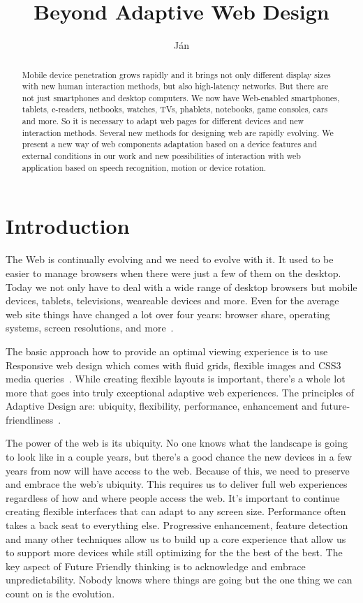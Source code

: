 \documentclass{iitsrc}
\title{Beyond Adaptive Web Design}
\author{Ján}{Antala}
\begin{document}
\begin{abstract}
Mobile device penetration grows rapidly and it brings not only different display sizes with new human interaction methods, but also high-latency networks. But there are not just smartphones and desktop computers. We now have Web-enabled smartphones, tablets, e-readers, netbooks, watches, TVs, phablets, notebooks, game consoles, cars and more. So it is necessary to adapt web pages for different devices and new interaction methods. Several new methods for designing web are rapidly evolving. We present a new way of web components adaptation based on a device features and external conditions in our work and new possibilities of interaction with web application based on speech recognition, motion or device rotation.
\end{abstract}

\section{Introduction}

The Web is continually evolving and we need to evolve with it. It used to be easier to manage browsers when there were just a few of them on the desktop. Today we not only have to deal with a wide range of desktop browsers but mobile devices, tablets, televisions, weareable devices and more. Even for the average web site things have changed a lot over four years: browser share, operating systems, screen resolutions, and more~\cite{ui17}.

The basic approach how to provide an optimal viewing experience is to use Responsive web design which comes with fluid grids, flexible images and CSS3 media queries~\cite{responsive}. While creating flexible layouts is important, there’s a whole lot more that goes into truly exceptional adaptive web experiences. The principles of Adaptive Design are: ubiquity, flexibility, performance, enhancement and future-friendliness~\cite{adaptivesxsw}.

The power of the web is its ubiquity. No one knows what the landscape is going to look like in a couple years, but there’s a good chance the new devices in a few years from now will have access to the web. Because of this, we need to preserve and embrace the web’s ubiquity. This requires us to deliver full web experiences regardless of how and where people access the web. It's important to continue creating flexible interfaces that can adapt to any screen size. Performance often takes a back seat to everything else. Progressive enhancement, feature detection and many other techniques allow us to build up a core experience that allow us to support more devices while still optimizing for the the best of the best. The key aspect of Future Friendly thinking is to acknowledge and embrace unpredictability. Nobody knows where things are going but the one thing we can count on is the evolution.
\end{document}
